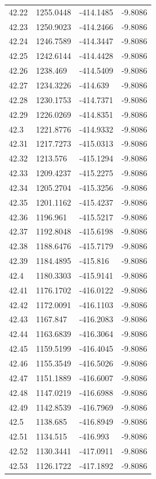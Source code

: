 \begin{table}[H]
\begin{tabular}{llll}
42.22 & 1255.0448 & -414.1485 & -9.8086 \\
42.23 & 1250.9023 & -414.2466 & -9.8086 \\
42.24 & 1246.7589 & -414.3447 & -9.8086 \\
42.25 & 1242.6144 & -414.4428 & -9.8086 \\
42.26 & 1238.469 & -414.5409 & -9.8086 \\
42.27 & 1234.3226 & -414.639 & -9.8086 \\
42.28 & 1230.1753 & -414.7371 & -9.8086 \\
42.29 & 1226.0269 & -414.8351 & -9.8086 \\
42.3 & 1221.8776 & -414.9332 & -9.8086 \\
42.31 & 1217.7273 & -415.0313 & -9.8086 \\
42.32 & 1213.576 & -415.1294 & -9.8086 \\
42.33 & 1209.4237 & -415.2275 & -9.8086 \\
42.34 & 1205.2704 & -415.3256 & -9.8086 \\
42.35 & 1201.1162 & -415.4237 & -9.8086 \\
42.36 & 1196.961 & -415.5217 & -9.8086 \\
42.37 & 1192.8048 & -415.6198 & -9.8086 \\
42.38 & 1188.6476 & -415.7179 & -9.8086 \\
42.39 & 1184.4895 & -415.816 & -9.8086 \\
42.4 & 1180.3303 & -415.9141 & -9.8086 \\
42.41 & 1176.1702 & -416.0122 & -9.8086 \\
42.42 & 1172.0091 & -416.1103 & -9.8086 \\
42.43 & 1167.847 & -416.2083 & -9.8086 \\
42.44 & 1163.6839 & -416.3064 & -9.8086 \\
42.45 & 1159.5199 & -416.4045 & -9.8086 \\
42.46 & 1155.3549 & -416.5026 & -9.8086 \\
42.47 & 1151.1889 & -416.6007 & -9.8086 \\
42.48 & 1147.0219 & -416.6988 & -9.8086 \\
42.49 & 1142.8539 & -416.7969 & -9.8086 \\
42.5 & 1138.685 & -416.8949 & -9.8086 \\
42.51 & 1134.515 & -416.993 & -9.8086 \\
42.52 & 1130.3441 & -417.0911 & -9.8086 \\
42.53 & 1126.1722 & -417.1892 & -9.8086 \\

\end{tabular}
\end{table}
